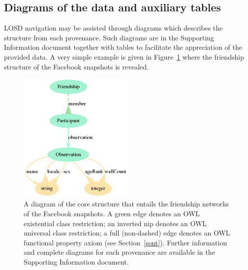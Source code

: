 \documentclass[journal,article,submit,moreauthors,pdftex]{Definitions/mdpi}
\begin{document}

\subsection{Diagrams of the data and auxiliary tables}\label{sdia}
LOSD navigation may be assisted through diagrams which describes
the structure from each provenance.
Such diagrams are in the Supporting Information document
together with tables to facilitate the appreciation of the provided data.
A very simple example is given in Figure~\ref{dia} where the friendship
structure of the Facebook snapshots is revealed.

\begin{figure}[!ht]
    \centering
    \includegraphics[width=0.5\textwidth]{../ontologies/facebook-legacy-AntonioAnzoategui18022013Friendship.ttl/draw}
    \caption{A diagram of the core structure that entails the friendship networks
    of the Facebook snapshots. A green edge denotes an OWL existential class restriction; an inverted nip denotes an OWL universal class restriction; a full (non-dashed) edge denotes an OWL functional property axiom (see Section~\ref{sont}). Further information and complete diagrams for each provenance are available in the Supporting Information document.}\label{dia}
\end{figure}
\end{document}
